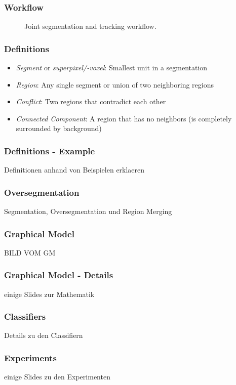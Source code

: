 \begin{frame}
    \frametitle{Workflow}
    \begin{figure}
        \centering
        \scalebox{0.65}{
            
        }
        \caption{Joint segmentation and tracking workflow.}
        \label{fig:joint-pipeline}
    \end{figure}
\end{frame}

\begin{frame}
    \frametitle{Definitions}
    \begin{itemize}
          \item \emph{Segment} or \emph{superpixel/-voxel}: Smallest unit in a segmentation
          \item \emph{Region}: Any single segment or union of two neighboring regions
          \item \emph{Conflict}: Two regions that contradict each other
          \item \emph{Connected Component}: A region that has no neighbors (is completely surrounded
        by background)
    \end{itemize}
\end{frame}

\begin{frame}
    \frametitle{Definitions - Example}
    Definitionen anhand von Beispielen erklaeren
\end{frame}

\begin{frame}
    \frametitle{Oversegmentation}
    Segmentation, Oversegmentation und Region Merging
\end{frame}

\begin{frame}
    \frametitle{Graphical Model}
    BILD VOM GM
\end{frame}

\begin{frame}
    \frametitle{Graphical Model - Details}
    einige Slides zur Mathematik
\end{frame}

\begin{frame}
    \frametitle{Classifiers}
    Details zu den Classifiern
\end{frame}

\begin{frame}
    \frametitle{Experiments}
    einige Slides zu den Experimenten
\end{frame}


